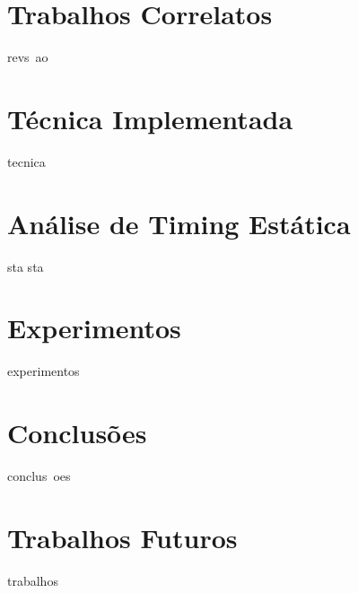 \documentclass[10pt,a4paper]{beamer}
\begin{document}
	\section{Trabalhos Correlatos}
	
		\begin{frame}
		revs~ao
		\end{frame}
	
	\section{Técnica Implementada}
	
		\begin{frame}
		tecnica
		\end{frame}
	
	\section{Análise de Timing Estática}
	
		\begin{frame}
		sta sta
		\end{frame}
	
	\section{Experimentos}
	
		\begin{frame}
		experimentos
		\end{frame}
	
	\section{Conclusões}
	
		\begin{frame}
		conclus~oes
		\end{frame}
	
	\section{Trabalhos Futuros}
		
		\begin{frame}
		trabalhos
		\end{frame}
	
\end{document}
